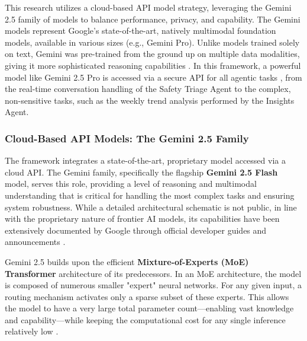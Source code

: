 This research utilizes a cloud-based API model strategy, leveraging the Gemini 2.5 family of models to balance performance, privacy, and capability. The Gemini models represent Google's state-of-the-art, natively multimodal foundation models, available in various sizes (e.g., Gemini Pro). Unlike models trained solely on text, Gemini was pre-trained from the ground up on multiple data modalities, giving it more sophisticated reasoning capabilities \cite{google2025gemini2_5}. In this framework, a powerful model like Gemini 2.5 Pro is accessed via a secure API for all agentic tasks \cite{gemini_api_docs}, from the real-time conversation handling of the Safety Triage Agent to the complex, non-sensitive tasks, such as the weekly trend analysis performed by the Insights Agent.

\subsubsection{Cloud-Based API Models: The Gemini 2.5 Family}

The framework integrates a state-of-the-art, proprietary model accessed via a cloud API. The Gemini family, specifically the flagship \textbf{Gemini 2.5 Flash} model, serves this role, providing a level of reasoning and multimodal understanding that is critical for handling the most complex tasks and ensuring system robustness. While a detailed architectural schematic is not public, in line with the proprietary nature of frontier AI models, its capabilities have been extensively documented by Google through official developer guides and announcements \cite{google2025gemini2_5,gemini_api_docs}.

Gemini 2.5 builds upon the efficient \textbf{Mixture-of-Experts (MoE) Transformer} architecture of its predecessors. In an MoE architecture, the model is composed of numerous smaller "expert" neural networks. For any given input, a routing mechanism activates only a sparse subset of these experts. This allows the model to have a very large total parameter count—enabling vast knowledge and capability—while keeping the computational cost for any single inference relatively low \cite{google2025gemini2_5}.

